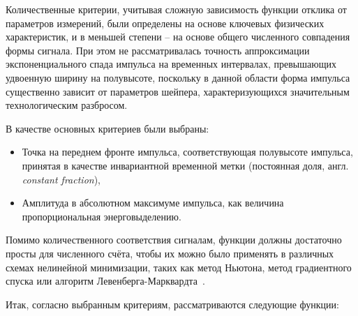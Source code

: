 Количественные критерии, учитывая сложную зависимость функции отклика
от параметров измерений, были определены на основе ключевых физических
характеристик, и в меньшей степени -- на основе общего численного
совпадения формы сигнала.
При этом не рассматривалась точность аппроксимации экспоненциального
спада импульса на временных интервалах, превышающих удвоенную ширину
на полувысоте, поскольку в данной области форма импульса существенно
зависит от параметров шейпера, характеризующихся значительным
технологическим разбросом.

В качестве основных критериев были выбраны:
\begin{itemize}
    \item Точка на переднем фронте импульса, соответствующая полувысоте
    импульса, принятая в качестве инвариантной временной метки (постоянная
    доля, англ. \emph{constant fraction}),
    \item Амплитуда в абсолютном максимуме импульса, как величина
    пропорциональная энерговыделению.
\end{itemize}

Помимо количественного соответствия сигналам, функции должны достаточно
просты для численного счёта, чтобы их можно было применять в различных
схемах нелинейной минимизации, таких как метод Ньютона, метод градиентного спуска
или алгоритм Левенберга-Марквардта~\cite{marquardt-lms}.

Итак, согласно выбранным критериям, рассматриваются следующие функции:

